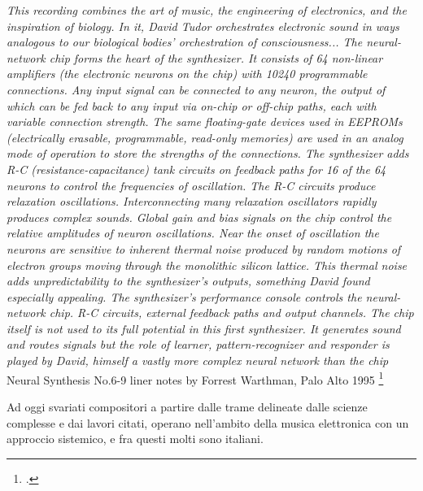 \begin{center}
\vspace{0.5cm}
\textit{This recording combines the art of music, the engineering of electronics,
and the inspiration of biology. In it,
David Tudor orchestrates electronic sound in ways analogous to
our biological bodies' orchestration of consciousness...
The neural-network chip forms the heart of the synthesizer.
It consists of 64 non-linear amplifiers (the electronic neurons on the chip)
with 10240 programmable connections.
Any input signal can be connected to any neuron,
the output of which can be fed back to any input via on-chip or off-chip paths,
each with variable connection strength. The same floating-gate devices used in EEPROMs
(electrically erasable, programmable, read-only memories)
are used in an analog mode of operation to store the strengths of the connections.
The synthesizer adds R-C (resistance-capacitance) tank circuits on feedback
paths for 16 of the 64 neurons to control the frequencies of oscillation.
The R-C circuits produce relaxation oscillations.
Interconnecting many relaxation oscillators rapidly produces complex sounds.
Global gain and bias signals on the chip control the relative amplitudes of neuron oscillations.
Near the onset of oscillation the neurons are sensitive to inherent
thermal noise produced by random motions of electron groups moving through
the monolithic silicon lattice. This thermal noise adds unpredictability
to the synthesizer’s outputs, something David found especially appealing.
The synthesizer’s performance console controls the neural-network chip.
R-C circuits, external feedback paths and output channels.
The chip itself is not used to its full potential in this first synthesizer.
It generates sound and routes signals but the role of learner,
pattern-recognizer and responder is played by David, himself a vastly
more complex neural network than the chip}
\vspace{0.5cm}
Neural Synthesis No.6-9 liner notes by Forrest Warthman, Palo Alto 1995
\footcite{http://www.lovely.com/albumnotes/notes1602.html}
\vspace{0.5cm}
\end{center}

Ad oggi svariati compositori a partire dalle trame delineate dalle scienze complesse e
dai lavori citati, operano nell'ambito della musica elettronica con un approccio sistemico,
e fra questi molti sono italiani. \\


